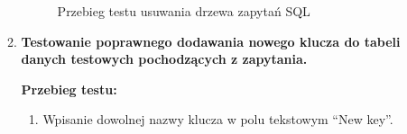 \begin{enumerate}
\begin{enumerate}
\begin{figure}[h]
                    \medspace

                    \caption{Przebieg testu usuwania drzewa zapytań SQL}
                    \label{deletingTreeManualTest}
                \end{figure}

                \FloatBarrier

            \item \textbf{Testowanie poprawnego dodawania nowego klucza do tabeli danych testowych
                pochodzących z zapytania.}

                \textbf{Przebieg testu:}

                \begin{enumerate}

                    \item Wpisanie dowolnej nazwy klucza w polu tekstowym ``New
                        key''.


\end{enumerate}
\end{enumerate}
\end{enumerate}
